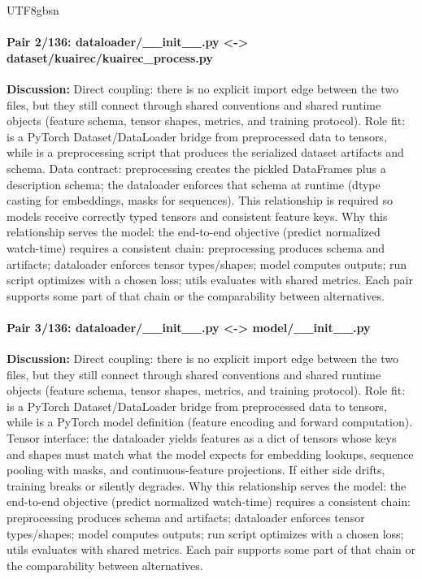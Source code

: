 \documentclass[11pt]{article}
\begin{document}
\begin{CJK*}{UTF8}{gbsn}
\paragraph{Pair 2/136: dataloader/\_\_init\_\_.py <-> dataset/kuairec/kuairec\_process.py}
\textbf{Discussion:} Direct coupling: there is no explicit import edge between the two files, but they still connect through shared conventions and shared runtime objects (feature schema, tensor shapes, metrics, and training protocol). Role fit: \texttt{} is a PyTorch Dataset/DataLoader bridge from preprocessed data to tensors, while \texttt{} is a preprocessing script that produces the serialized dataset artifacts and schema. Data contract: preprocessing creates the pickled DataFrames plus a description schema; the dataloader enforces that schema at runtime (dtype casting for embeddings, masks for sequences). This relationship is required so models receive correctly typed tensors and consistent feature keys. Why this relationship serves the model: the end-to-end objective (predict normalized watch-time) requires a consistent chain: preprocessing produces schema and artifacts; dataloader enforces tensor types/shapes; model computes outputs; run script optimizes with a chosen loss; utils evaluates with shared metrics. Each pair supports some part of that chain or the comparability between alternatives.

\paragraph{Pair 3/136: dataloader/\_\_init\_\_.py <-> model/\_\_init\_\_.py}
\textbf{Discussion:} Direct coupling: there is no explicit import edge between the two files, but they still connect through shared conventions and shared runtime objects (feature schema, tensor shapes, metrics, and training protocol). Role fit: \texttt{} is a PyTorch Dataset/DataLoader bridge from preprocessed data to tensors, while \texttt{} is a PyTorch model definition (feature encoding and forward computation). Tensor interface: the dataloader yields features as a dict of tensors whose keys and shapes must match what the model expects for embedding lookups, sequence pooling with masks, and continuous-feature projections. If either side drifts, training breaks or silently degrades. Why this relationship serves the model: the end-to-end objective (predict normalized watch-time) requires a consistent chain: preprocessing produces schema and artifacts; dataloader enforces tensor types/shapes; model computes outputs; run script optimizes with a chosen loss; utils evaluates with shared metrics. Each pair supports some part of that chain or the comparability between alternatives.


\end{CJK*}
\end{document}
